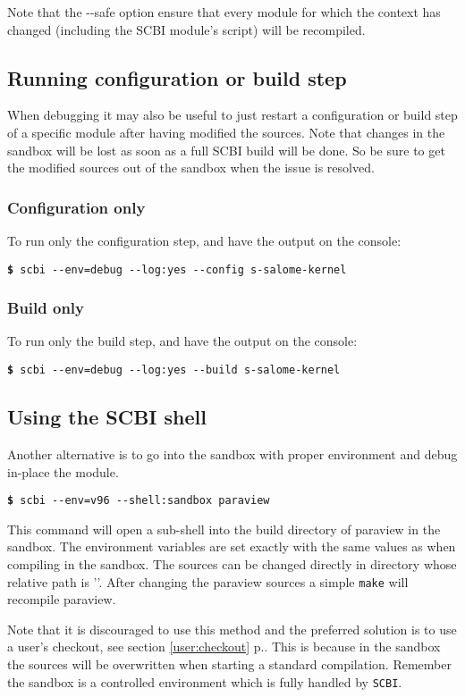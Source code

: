 \documentclass[a4paper,12pt,twoside]{article}
\newcommand{\code}[1]{\texttt{#1}}
\newcommand{\seeref}[1]{see section \ref{#1} p.\pageref{#1}}
\newcommand{\file}[1]{'{\path{#1}}'}
\newcommand{\cmd}[1]{\tabto{1cm}\hspace{0.5cm}\texttt{\textbf{\$} #1}}
\newcommand{\ddash}{-{}-}
\begin{document}
Note that the \ddash{}safe option ensure that every module for which the context has changed (including the SCBI module's script) will be recompiled.

\subsection{Running configuration or build step}

When debugging it may also be useful to just restart a configuration or build step of a specific module after having modified the sources. Note that changes in the sandbox will be lost as soon as a full SCBI build will be done. So be sure to get the modified sources out of the sandbox when the issue is resolved.

\subsubsection{Configuration only}

To run only the configuration step, and have the output on the console:

\cmd{scbi \ddash{}env=debug \ddash{}log:yes \ddash{}config s-salome-kernel}

\subsubsection{Build only}

To run only the build step, and have the output on the console:

\cmd{scbi \ddash{}env=debug \ddash{}log:yes \ddash{}build s-salome-kernel}

\subsection{Using the SCBI shell}

Another alternative is to go into the sandbox with proper environment and debug in-place the module.

\cmd{scbi \ddash{}env=v96 \ddash{}shell:sandbox paraview}

This command will open a sub-shell into the build directory of paraview in the sandbox. The environment variables are set exactly with the same values as when compiling in the sandbox. The sources can be changed directly in directory whose relative path is \file{../src}. After changing the paraview sources a simple \code{make} will recompile paraview.

Note that it is discouraged to use this method and the preferred solution is to use a user's checkout, \seeref{user:checkout}. This is because in the sandbox the sources will be overwritten when starting a standard compilation. Remember the sandbox is a controlled environment which is fully handled by \code{SCBI}.

\printindex

\end{document}
